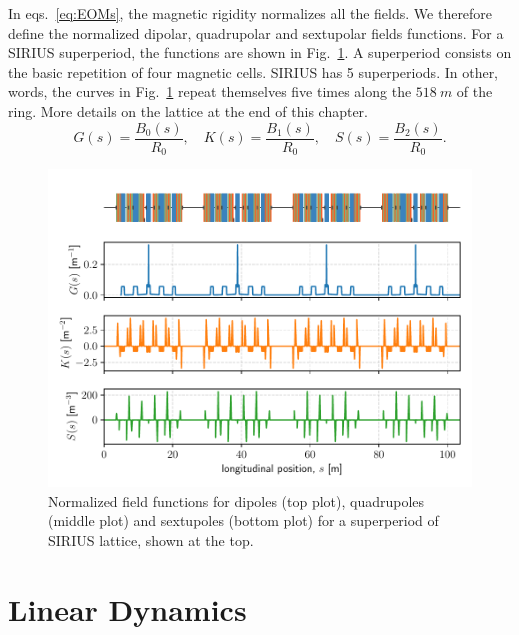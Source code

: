In eqs.~\eqref{eq:EOMs}, the magnetic rigidity normalizes all the fields. We therefore define the normalized dipolar, quadrupolar and sextupolar fields functions. For a SIRIUS superperiod, the functions are shown in Fig.~\ref{fig:field_funcs}. A superperiod consists on the basic repetition of four magnetic cells. SIRIUS has 5 superperiods. In other, words, the curves in Fig.~\ref{fig:field_funcs} repeat themselves five times along the $518~\unit{m}$ of the ring. More details on the lattice at the end of this chapter.
\begin{equation}
    G(s) = \frac{B_0(s)}{R_0}, \quad K(s) = \frac{B_1(s)}{R_0}, \quad S(s) = \frac{B_2(s)}{R_0}.
    \label{eq:mag_funcs}
\end{equation}
\begin{figure}[htb]
    \centering
    \includegraphics[width=\textwidth]{Images/field_functions.pdf}
    \caption{Normalized field functions for dipoles (top plot), quadrupoles (middle plot) and sextupoles (bottom plot) for a superperiod of SIRIUS lattice, shown at the top.}
    \label{fig:field_funcs}
\end{figure}
\section{Linear Dynamics}
